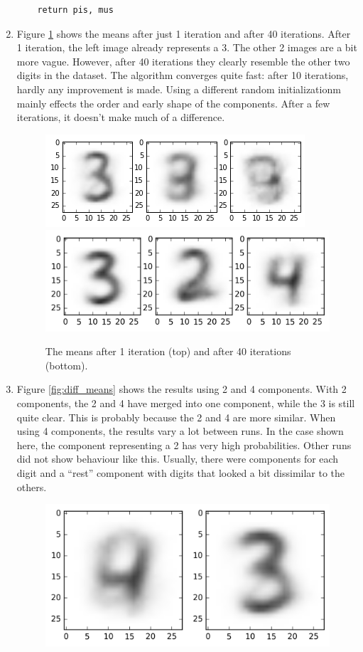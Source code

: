\documentclass[a4paper]{article}
\begin{document}
\begin{enumerate}
\begin{lstlisting}
    return pis, mus
\end{lstlisting}

\item Figure \ref{fig:means} shows the means after just 1 iteration and after 40 iterations. After 1 iteration, the left image already represents a 3. The other 2 images are a bit more vague. However, after 40 iterations they clearly resemble the other two digits in the dataset. The algorithm converges quite fast: after 10 iterations, hardly any improvement is made. Using a different random initializationm mainly effects the order and early shape of the components. After a few iterations, it doesn't make much of a difference.

\begin{figure}
\centering
\includegraphics[width=.6\linewidth]{figures/means_init.png} \\
\includegraphics[width=.6\linewidth]{figures/means.png}
\caption{The means after 1 iteration (top) and after 40 iterations (bottom).}
\label{fig:means}
\end{figure}
\item Figure \ref{fig:diff_means} shows the results using 2 and 4 components. With 2 components, the 2 and 4 have merged into one component, while the 3 is still quite clear. This is probably because the 2 and 4 are more similar. When using 4 components, the results vary a lot between runs. In the case shown here, the component representing a 2 has very high probabilities. Other runs did not show behaviour like this. Usually, there were components for each digit and a ``rest'' component with digits that looked a bit dissimilar to the others.
\begin{figure}
\centering
\includegraphics[width=.6\linewidth]{figures/means2.png} \\

\end{figure}
\end{enumerate}
\end{document}
